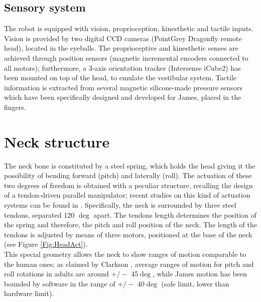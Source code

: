 \documentclass[conference]{IEEEtran}
\numberwithin{equation}{section}
\begin{document}
\subsection{Sensory system}

The robot is equipped with vision, proprioception, kinesthetic and tactile inputs. Vision is provided by two digital CCD cameras (PointGrey Dragonfly remote head), located in the eyeballs. The proprioceptive and kinesthetic senses are achieved through position sensors (magnetic incremental encoders connected to all motors); furthermore, a 3-axis orientation tracker (Intersense iCube2) has been mounted on top of the head, to emulate the vestibular system. Tactile information is extracted from several magnetic silicone-made pressure sensors which have been specifically designed and developed for James, placed in the fingers.

\section{Neck structure} \label{Sec:NeckStructure}

The neck bone is constituted by a steel spring, which holds the head giving it the possibility of bending forward (pitch) and laterally (roll). The actuation of these two degrees of freedom is obtained with a peculiar structure, recalling the design of a tendon-driven parallel manipulator; recent studies on this kind of actuation systems can be found in \cite{Verhoeven00parallel,Hay05parallel}. Specifically, the neck is surrounded by three steel tendons, separated 120 $\deg$ apart. The tendons length determines the position of the spring and therefore, the pitch and roll position of the neck. The length of the tendons is adjusted by means of three motors, positioned at the base of the neck (see Figure \ref{Fig:HeadAct}).\\This special geometry allows the neck to show ranges of motion comparable to the human ones; as claimed by Clarkson \cite{Clarkson00skeleton}, average ranges of motion for pitch and roll rotations in adults are around $+/-$ 45$\deg$, while James motion has been bounded by software in the range of $+/-$ 40$\deg$ (safe limit, lower than hardware limit).
\end{document}
